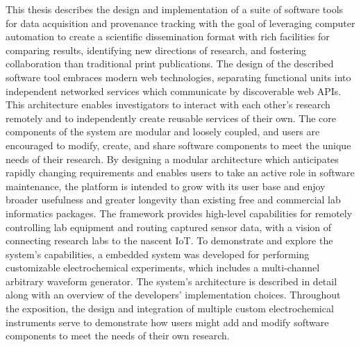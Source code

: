 \documentclass[../thesis]{subfiles}
\begin{document}
This thesis describes the design and implementation of a suite of
software tools for data acquisition and provenance tracking with the
goal of leveraging computer automation to create a scientific
dissemination format with rich facilities for comparing results,
identifying new directions of research, and fostering collaboration
than traditional print publications. The design of the described
software tool embraces modern web technologies, separating functional
units into independent networked services which communicate by
discoverable web \glspl{API}. This architecture enables investigators
to interact with each other's research remotely and to independently
create reusable services of their own. The core components of the
system are modular and loosely coupled, and users are encouraged to
modify, create, and share software components to meet the unique needs
of their research. By designing a modular architecture which
anticipates rapidly changing requirements and enables users to take an
active role in software maintenance, the platform is intended to grow
with its user base and enjoy broader usefulness and greater longevity
than existing free and commercial lab informatics packages.  The
framework provides high-level capabilities for remotely controlling
lab equipment and routing captured sensor data, with a vision of
connecting research labs to the nascent \gls{IoT}. To demonstrate and
explore the system's capabilities, a embedded system was developed for
performing customizable electrochemical experiments, which includes a
multi-channel arbitrary waveform generator. The system's architecture
is described in detail along with an overview of the developers'
implementation choices. Throughout the exposition, the design and
integration of multiple custom electrochemical instruments serve to
demonstrate how users might add and modify software components to meet
the needs of their own research.
\end{document}
